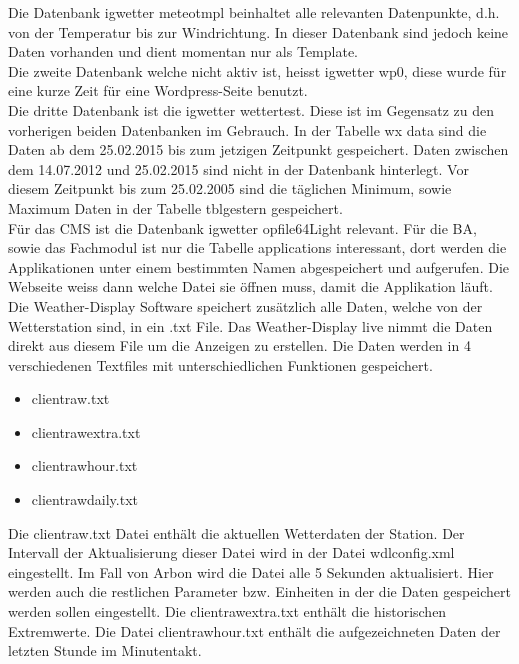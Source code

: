 Die Datenbank igwetter meteotmpl beinhaltet alle relevanten Datenpunkte, d.h. von der Temperatur bis zur Windrichtung. In dieser Datenbank sind jedoch keine Daten vorhanden und dient momentan nur als Template.\\
Die zweite Datenbank welche nicht aktiv ist, heisst igwetter wp0, diese wurde für eine kurze Zeit für eine Wordpress-Seite benutzt.\\


Die dritte Datenbank ist die igwetter wettertest. Diese ist im Gegensatz zu den vorherigen beiden Datenbanken im Gebrauch. In der Tabelle wx data sind die Daten ab dem 25.02.2015 bis zum jetzigen Zeitpunkt gespeichert. Daten zwischen dem 14.07.2012 und 25.02.2015 sind nicht in der Datenbank hinterlegt. Vor diesem Zeitpunkt bis zum 25.02.2005 sind die täglichen Minimum, sowie Maximum Daten in der Tabelle tblgestern gespeichert. \\
Für das CMS ist die Datenbank igwetter opfile64Light relevant. Für die BA, sowie das Fachmodul ist nur die Tabelle applications interessant, dort werden die Applikationen unter einem bestimmten Namen abgespeichert und aufgerufen. Die Webseite weiss dann welche Datei sie öffnen muss, damit die Applikation läuft.\\




Die Weather-Display Software speichert zusätzlich alle Daten, welche von der Wetterstation sind, in ein .txt File. Das Weather-Display live nimmt die Daten direkt aus diesem File um die Anzeigen zu erstellen. Die Daten werden in 4 verschiedenen Textfiles mit unterschiedlichen Funktionen gespeichert.
\begin{itemize}  
\item clientraw.txt
\item clientrawextra.txt
\item clientrawhour.txt
\item clientrawdaily.txt
\end{itemize}


Die clientraw.txt Datei enthält die aktuellen Wetterdaten der Station. Der Intervall der Aktualisierung dieser Datei wird in der Datei wdlconfig.xml eingestellt. Im Fall von Arbon wird die Datei alle 5 Sekunden aktualisiert.  Hier werden auch die restlichen Parameter bzw. Einheiten in der die Daten gespeichert werden sollen eingestellt. Die clientrawextra.txt enthält die historischen Extremwerte. Die Datei clientrawhour.txt enthält die aufgezeichneten Daten der letzten Stunde im Minutentakt.\cite{WeatherDisplay} \\


